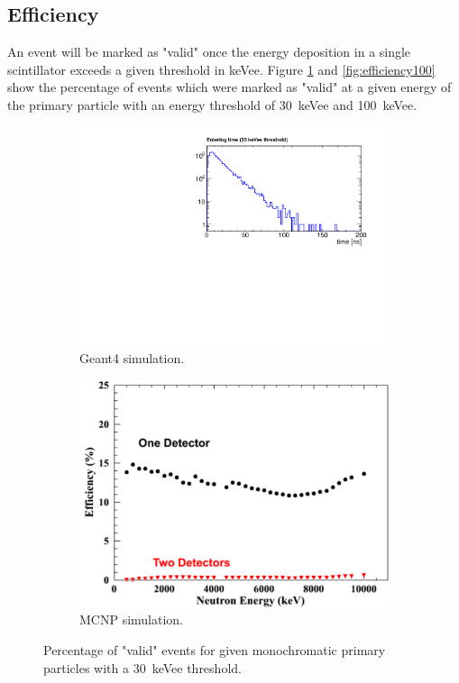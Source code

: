 \documentclass[12pt]{article}
\begin{document}
\subsection{Efficiency}

An event will be marked as "valid" once the energy deposition in a single scintillator exceeds a given threshold in keVee.  Figure \ref{fig:efficiency30} and \ref{fig:efficiency100} show the percentage of events which were marked as "valid" at a given energy of the primary particle with an energy threshold of \SI{30}{keVee} and \SI{100}{keVee}.

 \begin{figure}[H]
 	\begin{subfigure}[t]{0.49\textwidth}
 		\includegraphics[trim = 0cm 0cm 0cm 1.15cm, clip,width=\textwidth]{pics/timing.pdf}
 		\caption{Geant4 simulation.}
 	\end{subfigure}
 	\begin{subfigure}[t]{0.49\textwidth}
 		\includegraphics[trim = 0cm 0cm 0cm 1.15cm, clip, width=\textwidth]{pics/efficiency_MCNP30.pdf}
 		\caption{MCNP simulation.}
 	\end{subfigure}
 	\caption{Percentage of "valid" events for given monochromatic primary particles with a \SI{30}{keVee} threshold.}
 	\label{fig:efficiency30}
 \end{figure}
\end{document}

